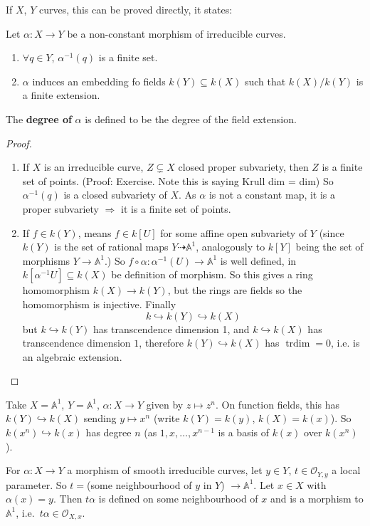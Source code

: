 \documentclass{article}
\newcommand{\A}{\mathbb{A}}
\DeclareMathOperator{\trdim}{trdim}
\begin{document}
If $X$, $Y$ curves, this can be proved directly, it states:
\begin{prop}
    Let $\alpha: X \to Y$ be a non-constant morphism of irreducible curves.
    \begin{enumerate}[label=(\roman*)]
        \item $\forall q \in Y$, $\alpha^{-1}(q)$ is a finite set.
        \item $\alpha$ induces an embedding fo fields $k(Y) \subseteq k(X)$ such that $k(X) / k(Y)$ is a finite extension.
    \end{enumerate}
\end{prop}
\begin{defi}
    The \textbf{degree of} $\alpha$ is defined to be the degree of the field extension.
\end{defi}
\begin{proof} \leavevmode
    \begin{enumerate}[label=(\roman*)]
        \item If $X$ is an irreducible curve, $Z \subsetneq X$ closed proper subvariety, then $Z$ is a finite set of points. (Proof: Exercise. Note this is saying Krull dim = dim)
            So $\alpha^{-1}(q)$ is a closed subvariety of $X$. As $\alpha$ is not a constant map, it is a proper subvariety $\Rightarrow$ it is a finite set of points.
        \item If $f \in k(Y)$, means $f \in k[U]$ for some affine open subvariety of $Y$ (since $k(Y)$ is the set of rational maps $Y \dashrightarrow \A^1$, analogously to $k[Y]$ being the set of morphisms $Y \to \A^1$.)
            So $f \circ \alpha: \alpha^{-1}(U) \to \A^1$ is well defined, in $k[\alpha^{-1} U] \subseteq k(X)$ be definition of morphism.
            So this gives a ring homomorphism $k(X) \to k(Y)$, but the rings are fields so the homomorphism is injective.
            Finally
            \begin{equation*}
                k \hookrightarrow k(Y) \hookrightarrow k(X)
            \end{equation*}
            but $k \hookrightarrow k(Y)$ has transcendence dimension 1, and $k \hookrightarrow k(X)$ has transcendence dimension $1$, therefore $k(Y) \hookrightarrow k(X)$ has $\trdim = 0$, i.e. is an algebraic extension.
    \end{enumerate}
\end{proof}
\begin{eg}
    Take $X =\A^1$, $Y = \A^1$, $\alpha: X \to Y$ given by $z \mapsto z^n$. On function fields, this has $k(Y) \hookrightarrow k(X)$ sending $y \mapsto x^n$ (write $k(Y) = k(y)$, $k(X) = k(x)$).
    So $k(x^n) \hookrightarrow k(x)$ has degree $n$ (as $1, x, \dotsc, x^{n-1}$ is a basis of $k(x)$ over $k(x^n)$).
\end{eg}
For $\alpha: X \to Y$ a morphism of smooth irreducible curves, let $y \in Y$, $t \in \mathcal{O}_{Y, y}$ a local parameter.
So $t = $(some neighbourhood of $y$ in $Y$) $\to \A^1$.
Let $x \in X$ with $\alpha(x) = y$. Then $t\alpha$ is defined on some neighbourhood of $x$ and is a morphism to $\A^1$, i.e.\ $t \alpha \in \mathcal{O}_{X,x}$.
\end{document}
